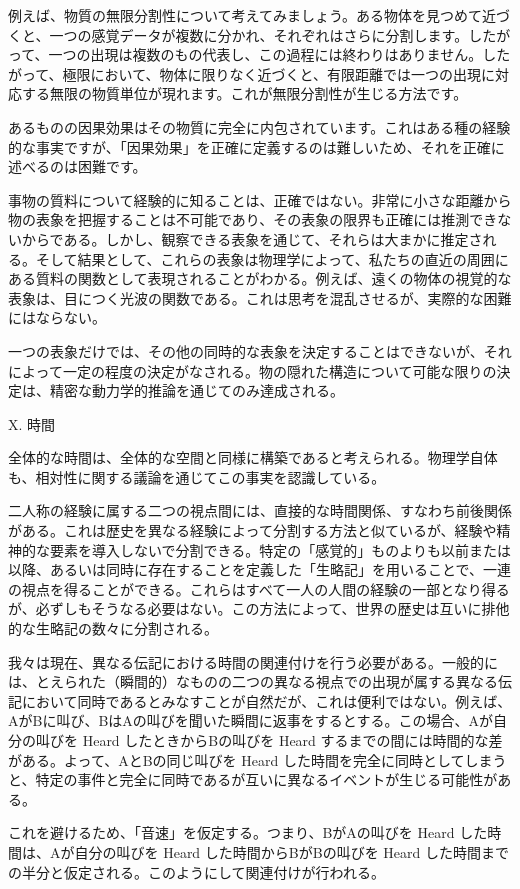 \documentclass[a4paper,11pt,openany]{ltjsbook}
\begin{document}
例えば、物質の無限分割性について考えてみましょう。ある物体を見つめて近づくと、一つの感覚データが複数に分かれ、それぞれはさらに分割します。したがって、一つの出現は複数のもの代表し、この過程には終わりはありません。したがって、極限において、物体に限りなく近づくと、有限距離では一つの出現に対応する無限の物質単位が現れます。これが無限分割性が生じる方法です。

あるものの因果効果はその物質に完全に内包されています。これはある種の経験的な事実ですが、「因果効果」を正確に定義するのは難しいため、それを正確に述べるのは困難です。


事物の質料について経験的に知ることは、正確ではない。非常に小さな距離から物の表象を把握することは不可能であり、その表象の限界も正確には推測できないからである。しかし、観察できる表象を通じて、それらは大まかに推定される。そして結果として、これらの表象は物理学によって、私たちの直近の周囲にある質料の関数として表現されることがわかる。例えば、遠くの物体の視覚的な表象は、目につく光波の関数である。これは思考を混乱させるが、実際的な困難にはならない。

一つの表象だけでは、その他の同時的な表象を決定することはできないが、それによって一定の程度の決定がなされる。物の隠れた構造について可能な限りの決定は、精密な動力学的推論を通じてのみ達成される。

X. 時間

全体的な時間は、全体的な空間と同様に構築であると考えられる。物理学自体も、相対性に関する議論を通じてこの事実を認識している。

二人称の経験に属する二つの視点間には、直接的な時間関係、すなわち前後関係がある。これは歴史を異なる経験によって分割する方法と似ているが、経験や精神的な要素を導入しないで分割できる。特定の「感覚的」ものよりも以前または以降、あるいは同時に存在することを定義した「生略記」を用いることで、一連の視点を得ることができる。これらはすべて一人の人間の経験の一部となり得るが、必ずしもそうなる必要はない。この方法によって、世界の歴史は互いに排他的な生略記の数々に分割される。

我々は現在、異なる伝記における時間の関連付けを行う必要がある。一般的には、とえられた（瞬間的）なものの二つの異なる視点での出現が属する異なる伝記において同時であるとみなすことが自然だが、これは便利ではない。例えば、AがBに叫び、BはAの叫びを聞いた瞬間に返事をするとする。この場合、Aが自分の叫びを Heard したときからBの叫びを Heard するまでの間には時間的な差がある。よって、AとBの同じ叫びを Heard した時間を完全に同時としてしまうと、特定の事件と完全に同時であるが互いに異なるイベントが生じる可能性がある。

これを避けるため、「音速」を仮定する。つまり、BがAの叫びを Heard した時間は、Aが自分の叫びを Heard した時間からBがBの叫びを Heard した時間までの半分と仮定される。このようにして関連付けが行われる。
\end{document}
